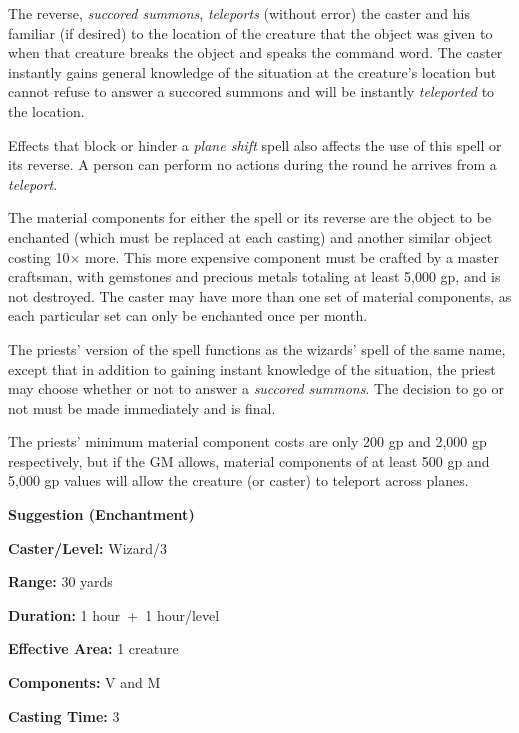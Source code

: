 \begin{multicols}{2}
The reverse, \textit{succored summons}, \textit{teleports} (without error) the caster and his familiar (if desired) to the location of the creature that the object was given to when that creature breaks the object and speaks the command word.  The caster instantly gains general knowledge of the situation at the creature's location but cannot refuse to answer a succored summons and will be instantly \textit{teleported} to the location.  

Effects that block or hinder a \textit{plane shift} spell also affects the use of this spell or its reverse.  A person can perform no actions during the round he arrives from a \textit{teleport}.

The material components for either the spell or its reverse are the object to be enchanted (which must be replaced at each casting) and another similar object costing 10$\times$ more.  This more expensive component must be crafted by a master craftsman, with gemstones and precious metals totaling at least 5,000 gp, and is not destroyed.  The caster may have more than one set of material components, as each particular set can only be enchanted once per month.  

The priests' version of the spell functions as the wizards' spell of the same name, except that in addition to gaining instant knowledge of the situation, the priest may choose whether or not to answer a \textit{succored summons}.  The decision to go or not must be made immediately and is final.   

The priests' minimum material component costs are only 200 gp and 2,000 gp respectively, but if the GM allows, material components of at least 500 gp and 5,000 gp values will allow the creature (or caster) to teleport across planes.

\vspace{1em}

\noindent
\begin{minipage}{\columnwidth}

\noindent \textbf{Suggestion (Enchantment)}

\noindent \textbf{Caster/Level:} Wizard/3

\noindent \textbf{Range:} 30 yards

\noindent \textbf{Duration:} 1 hour~+~1 hour/level

\noindent \textbf{Effective Area:} 1 creature

\noindent \textbf{Components:} V and M

\noindent \textbf{Casting Time:} 3


\end{minipage}
\end{multicols}
